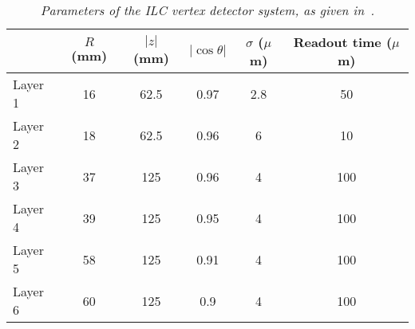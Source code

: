         \begin{table}[H]
        \begin{center}
        \begin{tabular}{l c c c c c}
        \hline
        			& $R$ (mm) & $|z|$ (mm) & $|\cos\theta|$ & $\sigma$ ($\mu$m) & Readout time ($\mu$m)\\
        \hline
            Layer 1 & 16 & 62.5 & 0.97 & 2.8 & 50 \\
            Layer 2 & 18 & 62.5 & 0.96 & 6 & 10 \\
        \hline
            Layer 3 & 37 & 125 & 0.96 &  4 & 100 \\
            Layer 4 & 39 & 125 & 0.95 &  4 & 100 \\
        \hline
            Layer 5 & 58 & 125 & 0.91 &  4 & 100 \\
            Layer 6 & 60 & 125 & 0.9 &   4 & 100 \\
        \hline
        \end{tabular}
        \end{center}
        \caption{\sl Parameters of the ILC vertex detector system, as given in~\cite{bib:ILC}. }
        \label{table:ILCvtxparam}
        \end{table}